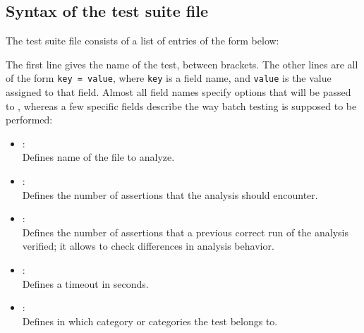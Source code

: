 \subsection{Syntax of the test suite file}
The test suite file consists of a list of entries of the form below:

The first line gives the name of the test, between brackets.
The other lines are all of the form \verb#key = value#, where
\verb#key# is a field name, and \verb#value# is the value assigned
to that field.
Almost all field names specify options that will be passed to
\sanalyze, whereas a few specific fields describe the way batch
testing is supposed to be performed:
\begin{itemize}
\item[\sfield{file}]: \\
  Defines name of the file to analyze.
\item[\sfield{asserts\_total}]: \\
  Defines the number of assertions that the analysis should encounter.
\item[\sfield{asserts\_proved}]: \\
  Defines the number of assertions that a previous correct run of the
  analysis verified; it allows to check differences in analysis behavior.
\item[\sfield{timeout}]: \\
  Defines a timeout in seconds.
\item[\sfield{category}] \optdev: \\
  Defines in which category or categories the test belongs to.
\end{itemize}

